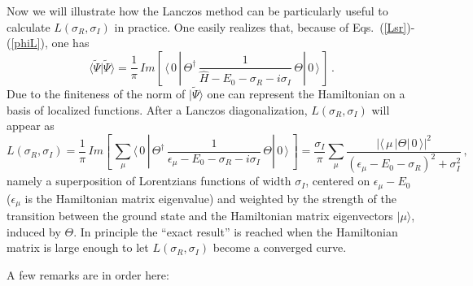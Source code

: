 Now we will illustrate how the Lanczos method can be particularly useful  to calculate $L(\sigma_R,\sigma_I)$ in practice.
One easily realizes that, because of Eqs.~(\ref{Lsr})-(\ref{phiL}), one has 
\begin{equation}
\langle\tilde\Psi |\tilde\Psi\rangle= \frac{1}{\pi}\,Im\left[\, \langle \,0\,|\,\Theta^\dagger \,
\frac{1}{\hat H - E_0-\sigma_R-i\sigma_I}\,\Theta|\,0\,\rangle\,\right]\,.
\end{equation}
Due to the finiteness of the norm of $|\tilde\Psi\rangle$  one can represent the Hamiltonian on a 
basis of localized functions. After a Lanczos diagonalization, $L(\sigma_R,\sigma_I)$ will appear as 
\begin{equation}\label{convolution}
L(\sigma_R,\sigma_I)= \frac{1}{\pi}\,Im\left[\,\sum_\mu \langle \,0\,|\,\Theta^\dagger \,
\frac{1}{\epsilon_\mu - E_0-\sigma_R-i\sigma_I}\,\Theta|\,0\,\rangle\,\right]=
\frac{\sigma_I}{\pi}\sum_\mu \frac{|\langle\, \mu\,|\Theta|\,0\,\rangle|^2}{(\epsilon_\mu-E_0-\sigma_R)^2+\sigma_I^2}\,,
\end{equation}
namely a superposition
of Lorentzians functions of width $\sigma_I$, centered on $\epsilon_\mu-E_0$ ($\epsilon_\mu$ is the Hamiltonian matrix eigenvalue)
and weighted by
the strength of the transition between the ground state and the Hamiltonian matrix eigenvectors $|\mu\rangle$, induced by $\Theta$.
In principle the ``exact result'' is reached when the Hamiltonian matrix is large enough to let $L(\sigma_R,\sigma_I)$ become 
a converged curve. 

A few remarks are in order here: 

